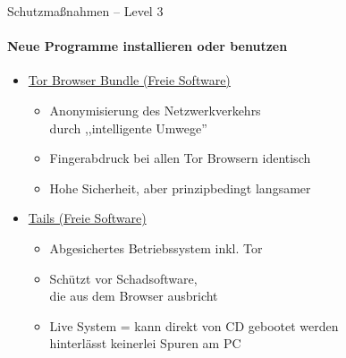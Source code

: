 \begin{frame}{Schutzmaßnahmen -- Level 3}
\framesubtitle{Neue Programme installieren oder benutzen}
  \begin{itemize}
    \item \href{https://www.torproject.org}{Tor Browser Bundle (Freie Software)}
    \begin{itemize}
      \item Anonymisierung des Netzwerkverkehrs\\durch ,,intelligente Umwege''
      \item Fingerabdruck bei allen Tor Browsern identisch
      \item Hohe Sicherheit, aber prinzipbedingt langsamer
    \end{itemize}
    \item \href{https://tails.boum.org}{Tails (Freie Software)}
    \begin{itemize}
      \item Abgesichertes Betriebssystem inkl. Tor
      \item Schützt vor Schadsoftware,\\ die aus dem Browser ausbricht
      \item Live System = kann direkt von CD gebootet werden\\ hinterlässt keinerlei Spuren am PC
    \end{itemize}
  \end{itemize}
\end{frame}

\endinput
